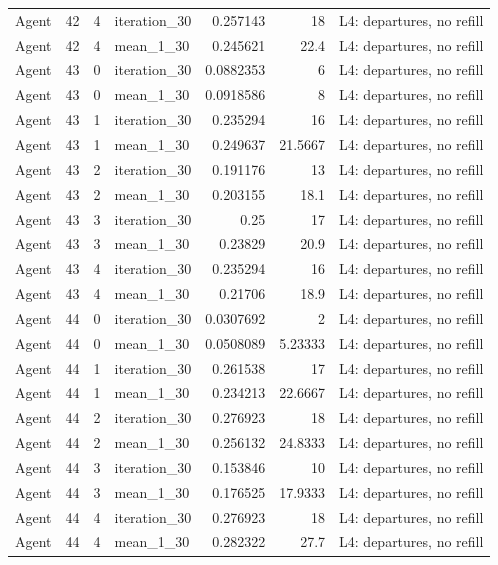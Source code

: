\begin{table}[htbp!]
\begin{tabular}{lrrlrrl}
Agent & 42 & 4 & iteration\_30 & 0.257143 & 18 & L4: departures, no refill \\
Agent & 42 & 4 & mean\_1\_30 & 0.245621 & 22.4 & L4: departures, no refill \\
Agent & 43 & 0 & iteration\_30 & 0.0882353 & 6 & L4: departures, no refill \\
Agent & 43 & 0 & mean\_1\_30 & 0.0918586 & 8 & L4: departures, no refill \\
Agent & 43 & 1 & iteration\_30 & 0.235294 & 16 & L4: departures, no refill \\
Agent & 43 & 1 & mean\_1\_30 & 0.249637 & 21.5667 & L4: departures, no refill \\
Agent & 43 & 2 & iteration\_30 & 0.191176 & 13 & L4: departures, no refill \\
Agent & 43 & 2 & mean\_1\_30 & 0.203155 & 18.1 & L4: departures, no refill \\
Agent & 43 & 3 & iteration\_30 & 0.25 & 17 & L4: departures, no refill \\
Agent & 43 & 3 & mean\_1\_30 & 0.23829 & 20.9 & L4: departures, no refill \\
Agent & 43 & 4 & iteration\_30 & 0.235294 & 16 & L4: departures, no refill \\
Agent & 43 & 4 & mean\_1\_30 & 0.21706 & 18.9 & L4: departures, no refill \\
Agent & 44 & 0 & iteration\_30 & 0.0307692 & 2 & L4: departures, no refill \\
Agent & 44 & 0 & mean\_1\_30 & 0.0508089 & 5.23333 & L4: departures, no refill \\
Agent & 44 & 1 & iteration\_30 & 0.261538 & 17 & L4: departures, no refill \\
Agent & 44 & 1 & mean\_1\_30 & 0.234213 & 22.6667 & L4: departures, no refill \\
Agent & 44 & 2 & iteration\_30 & 0.276923 & 18 & L4: departures, no refill \\
Agent & 44 & 2 & mean\_1\_30 & 0.256132 & 24.8333 & L4: departures, no refill \\
Agent & 44 & 3 & iteration\_30 & 0.153846 & 10 & L4: departures, no refill \\
Agent & 44 & 3 & mean\_1\_30 & 0.176525 & 17.9333 & L4: departures, no refill \\
Agent & 44 & 4 & iteration\_30 & 0.276923 & 18 & L4: departures, no refill \\
Agent & 44 & 4 & mean\_1\_30 & 0.282322 & 27.7 & L4: departures, no refill \\

\end{tabular}
\end{table}
